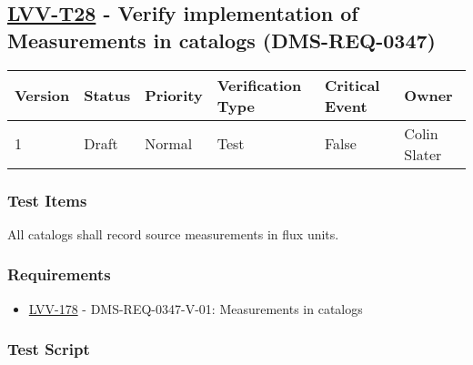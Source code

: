 \hypertarget{lvv-t28---verify-implementation-of-measurements-in-catalogs-dms-req-0347}{%
\subsection{\texorpdfstring{\href{https://jira.lsstcorp.org/secure/Tests.jspa\#/testCase/LVV-T28}{LVV-T28}
- Verify implementation of Measurements in catalogs
(DMS-REQ-0347)}{LVV-T28 - Verify implementation of Measurements in catalogs (DMS-REQ-0347)}}\label{lvv-t28---verify-implementation-of-measurements-in-catalogs-dms-req-0347}}

\begin{longtable}[]{@{}llllll@{}}
\toprule
Version & Status & Priority & Verification Type & Critical Event &
Owner\tabularnewline
\midrule
\endhead
1 & Draft & Normal & Test & False & Colin Slater\tabularnewline
\bottomrule
\end{longtable}

\hypertarget{test-items-4}{%
\subsubsection{Test Items}\label{test-items-4}}

All catalogs shall record source measurements in flux units.

\hypertarget{requirements-5}{%
\subsubsection{Requirements}\label{requirements-5}}

\begin{itemize}
\tightlist
\item
  \href{https://jira.lsstcorp.org/browse/LVV-178}{LVV-178} -
  DMS-REQ-0347-V-01: Measurements in catalogs
\end{itemize}

\hypertarget{test-script-5}{%
\subsubsection{Test Script}\label{test-script-5}}

